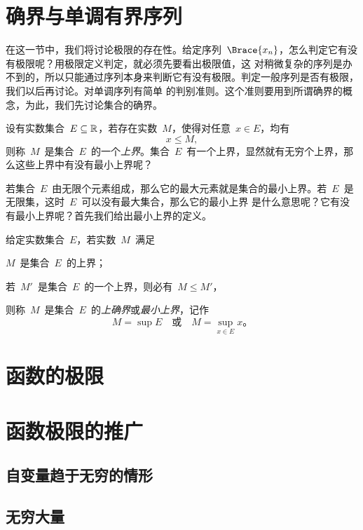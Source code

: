 \section{确界与单调有界序列}

在这一节中，我们将讨论极限的存在性。给定序列~$\Brace{x_n}$，怎么判定它有没有极限呢？用极限定义判定，就必须先要看出极限值，这
对稍微复杂的序列是办不到的，所以只能通过序列本身来判断它有没有极限。判定一般序列是否有极限，我们以后再讨论。对单调序列有简单
的判别准则。这个准则要用到所谓确界的概念，为此，我们先讨论集合的确界。

设有实数集合~$E\subseteq\mathbb{R}$，若存在实数~$M$，使得对任意~$x\in E$，均有
\[
  x\leq M,
\]
则称~$M$~是集合~$E$~的一个\emph{上界}。集合~$E$~有一个上界，显然就有无穷个上界，那么这些上界中有没有最小上界呢？

若集合~$E$~由无限个元素组成，那么它的最大元素就是集合的最小上界。若~$E$~是无限集，这时~$E$~可以没有最大集合，那么它的最小上界
是什么意思呢？它有没有最小上界呢？首先我们给出最小上界的定义。

\begin{definition}
给定实数集合~$E$，若实数~$M$~满足
\begin{enumlist}
\item $M$~是集合~$E$~的上界；
\item 若~$M'$~是集合~$E$~的一个上界，则必有~$M\leq M'$，
\end{enumlist}
则称~$M$~是集合~$E$~的\emph{上确界}或\emph{最小上界}，记作
\[
  M=\sup E\quad\text{或}\quad M=\sup_{x\in E}x。
\]
\end{definition}



\begin{exercise}
\item
\end{exercise}
\section{函数的极限}
\begin{exercise}
\item
\end{exercise}
\section{函数极限的推广}
\subsection{自变量趋于无穷的情形}
\subsection{无穷大量}

